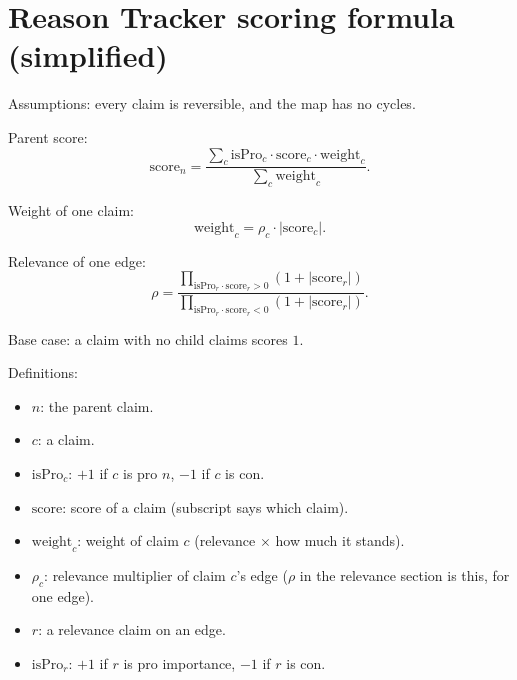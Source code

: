 \documentclass[11pt]{article}
\begin{document}
\section*{Reason Tracker scoring formula (simplified)}

Assumptions: every claim is reversible, and the map has no cycles.

Parent score:
\begin{equation*}
\mathrm{score}_n = \frac{\sum_c \mathrm{isPro}_c \cdot \mathrm{score}_c \cdot \mathrm{weight}_c}{\sum_c \mathrm{weight}_c}.
\end{equation*}

Weight of one claim:
\begin{equation*}
\mathrm{weight}_c = \rho_c \cdot |\mathrm{score}_c|.
\end{equation*}

Relevance of one edge:
\begin{equation*}
\rho = \frac{\prod_{\mathrm{isPro}_r \cdot \mathrm{score}_r > 0} (1 + |\mathrm{score}_r|)}{\prod_{\mathrm{isPro}_r \cdot \mathrm{score}_r < 0} (1 + |\mathrm{score}_r|)}.
\end{equation*}

Base case: a claim with no child claims scores $1$.

Definitions:
\begin{itemize}
  \item $n$: the parent claim.
  \item $c$: a claim.
  \item $\mathrm{isPro}_c$: $+1$ if $c$ is pro $n$, $-1$ if $c$ is con.
  \item $\mathrm{score}$: score of a claim (subscript says which claim).
  \item $\mathrm{weight}_c$: weight of claim $c$ (relevance $\times$
        how much it stands).
  \item $\rho_c$: relevance multiplier of claim $c$'s edge ($\rho$ in
        the relevance section is this, for one edge).
  \item $r$: a relevance claim on an edge.
  \item $\mathrm{isPro}_r$: $+1$ if $r$ is pro importance, $-1$ if $r$
        is con.
\end{itemize}
\end{document}
